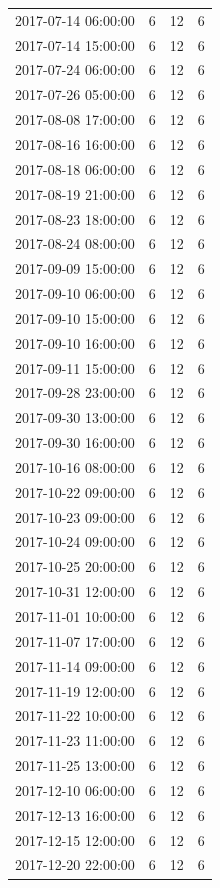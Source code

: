 \begin{tabular}{lrrr}
2017-07-14 06:00:00 & 6 & 12 & 6 \\
2017-07-14 15:00:00 & 6 & 12 & 6 \\
2017-07-24 06:00:00 & 6 & 12 & 6 \\
2017-07-26 05:00:00 & 6 & 12 & 6 \\
2017-08-08 17:00:00 & 6 & 12 & 6 \\
2017-08-16 16:00:00 & 6 & 12 & 6 \\
2017-08-18 06:00:00 & 6 & 12 & 6 \\
2017-08-19 21:00:00 & 6 & 12 & 6 \\
2017-08-23 18:00:00 & 6 & 12 & 6 \\
2017-08-24 08:00:00 & 6 & 12 & 6 \\
2017-09-09 15:00:00 & 6 & 12 & 6 \\
2017-09-10 06:00:00 & 6 & 12 & 6 \\
2017-09-10 15:00:00 & 6 & 12 & 6 \\
2017-09-10 16:00:00 & 6 & 12 & 6 \\
2017-09-11 15:00:00 & 6 & 12 & 6 \\
2017-09-28 23:00:00 & 6 & 12 & 6 \\
2017-09-30 13:00:00 & 6 & 12 & 6 \\
2017-09-30 16:00:00 & 6 & 12 & 6 \\
2017-10-16 08:00:00 & 6 & 12 & 6 \\
2017-10-22 09:00:00 & 6 & 12 & 6 \\
2017-10-23 09:00:00 & 6 & 12 & 6 \\
2017-10-24 09:00:00 & 6 & 12 & 6 \\
2017-10-25 20:00:00 & 6 & 12 & 6 \\
2017-10-31 12:00:00 & 6 & 12 & 6 \\
2017-11-01 10:00:00 & 6 & 12 & 6 \\
2017-11-07 17:00:00 & 6 & 12 & 6 \\
2017-11-14 09:00:00 & 6 & 12 & 6 \\
2017-11-19 12:00:00 & 6 & 12 & 6 \\
2017-11-22 10:00:00 & 6 & 12 & 6 \\
2017-11-23 11:00:00 & 6 & 12 & 6 \\
2017-11-25 13:00:00 & 6 & 12 & 6 \\
2017-12-10 06:00:00 & 6 & 12 & 6 \\
2017-12-13 16:00:00 & 6 & 12 & 6 \\
2017-12-15 12:00:00 & 6 & 12 & 6 \\
2017-12-20 22:00:00 & 6 & 12 & 6 \\

\end{tabular}
